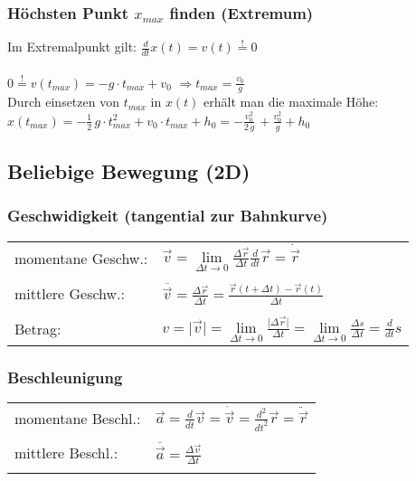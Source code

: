 		
		
		
	\subsubsection{Höchsten Punkt $x_{max}$ finden (Extremum)}
	
	Im Extremalpunkt gilt: $\frac{d}{dt} x(t) = v(t) \overset{!}{=} 0$ \\
	\\
	$0 \overset{!}{=} v(t_{max}) = -g \cdot t_{max} + v_0 $ \qquad \qquad $\Rightarrow t_{max} = \frac{v_0}{g}$ \\
	
	Durch einsetzen von $t_{max}$ in $x(t)$ erhält man die maximale Höhe: \\
	$x(t_{max}) = - \frac{1}{2}\, g \cdot t_{max}^2 + v_0 \cdot t_{max} + h_0 = - \frac{v_0^2}{2 \, g}\, + \frac{v_0^2}{g} + h_0 $
		
		
		
	\subsection{Beliebige Bewegung (2D)}
		
		\subsubsection{Geschwidigkeit (tangential zur Bahnkurve)}
		
		\begin{tabular}{ll}
		momentane Geschw.: & $ \vec{v} = \lim \limits_{\Delta t \rightarrow 0} \frac{\Delta \vec{r}}{\Delta t}  \frac{d}{dt} \vec{r} = \dot{\vec{r}}$ \\	
		\\
		mittlere Geschw.: & $\overline{\vec{v}} = \frac{\Delta \vec{r}}{\Delta t} = \frac{\vec{r}(t + \Delta t) - \vec{r}(t)}{\Delta t} $ \\
		\\
		Betrag: & $v = \vert \vec{v} \vert = \lim \limits_{\Delta t \rightarrow 0} \frac{ \vert \Delta \vec{r} \vert}{\Delta t} = \lim \limits_{\Delta t \rightarrow 0} \frac{\Delta s }{\Delta t} = \frac{d}{dt} s$ 
		\end{tabular}
		
		
		
		\subsubsection{Beschleunigung}
		\begin{tabular}{ll}
		momentane Beschl.: & $ \vec{a} = \frac{d}{dt} \vec{v} = \dot{\vec{v}} = \frac{d^2}{d t^2} \vec{r} = \ddot{\vec{r}}$ \\	
		\\
		mittlere Beschl.: & $\overline{\vec{a}} = \frac{\Delta \vec{v}}{\Delta t} $ \\
		\\
		\end{tabular}
		

